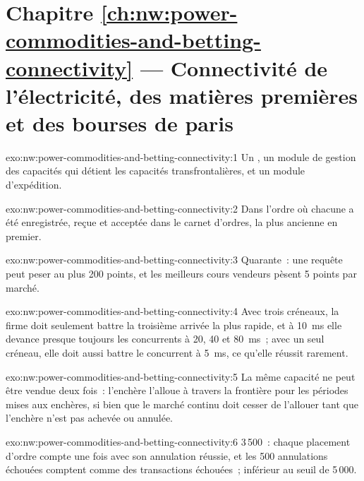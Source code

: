 \section*{Chapitre \ref{ch:nw:power-commodities-and-betting-connectivity} --- Connectivité de l'électricité, des matières premières et des bourses de paris}

\begin{solution}{exo:nw:power-commodities-and-betting-connectivity:1}
Un , un module de gestion des capacités qui détient les capacités transfrontalières, et un module d'expédition.
\end{solution}

\begin{solution}{exo:nw:power-commodities-and-betting-connectivity:2}
Dans l'ordre où chacune a été enregistrée, reçue et acceptée dans le carnet d'ordres, la plus ancienne en premier.
\end{solution}

\begin{solution}{exo:nw:power-commodities-and-betting-connectivity:3}
Quarante~: une requête peut peser au plus 200 points, et les meilleurs cours vendeurs pèsent 5 points par marché.
\end{solution}

\begin{solution}{exo:nw:power-commodities-and-betting-connectivity:4}
Avec trois créneaux, la firme doit seulement battre la troisième arrivée la plus rapide, et à \qty{10}{\milli\second} elle devance presque toujours les concurrents à 20,
40 et \qty{80}{\milli\second}~; avec un seul créneau, elle doit aussi battre le concurrent à \qty{5}{\milli\second}, ce qu'elle réussit rarement.
\end{solution}

\begin{solution}{exo:nw:power-commodities-and-betting-connectivity:5}
La même capacité ne peut être vendue deux fois~: l'enchère l'alloue à travers la frontière pour les périodes mises aux enchères, si bien que le marché continu
doit cesser de l'allouer tant que l'enchère n'est pas achevée ou annulée.
\end{solution}

\begin{solution}{exo:nw:power-commodities-and-betting-connectivity:6}
3\,500~: chaque placement d'ordre compte une fois avec son annulation réussie, et les 500 annulations échouées comptent comme des transactions échouées~;
inférieur au seuil de 5\,000.
\end{solution}

